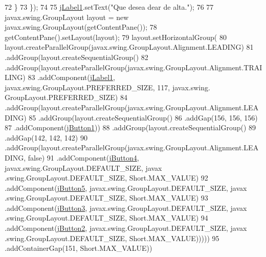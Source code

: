 \begin{DoxyCode}
72             \}
73         \});
74 
75         \mbox{\hyperlink{class_interfaz_package_1_1_interfaz_alta_a353b3664adfc462e1ec4be9e78f5da33}{jLabel1}}.setText(\textcolor{stringliteral}{"Que desea dear de alta."});
76 
77         javax.swing.GroupLayout layout = \textcolor{keyword}{new} javax.swing.GroupLayout(getContentPane());
78         getContentPane().setLayout(layout);
79         layout.setHorizontalGroup(
80             layout.createParallelGroup(javax.swing.GroupLayout.Alignment.LEADING)
81             .addGroup(layout.createSequentialGroup()
82                 .addGroup(layout.createParallelGroup(javax.swing.GroupLayout.Alignment.TRAILING)
83                     .addComponent(\mbox{\hyperlink{class_interfaz_package_1_1_interfaz_alta_a353b3664adfc462e1ec4be9e78f5da33}{jLabel1}}, javax.swing.GroupLayout.PREFERRED\_SIZE, 117, javax.swing.
      GroupLayout.PREFERRED\_SIZE)
84                     .addGroup(layout.createParallelGroup(javax.swing.GroupLayout.Alignment.LEADING)
85                         .addGroup(layout.createSequentialGroup()
86                             .addGap(156, 156, 156)
87                             .addComponent(\mbox{\hyperlink{class_interfaz_package_1_1_interfaz_alta_a04cc5364c89f6cbda8e46022ea7ddbf4}{jButton1}}))
88                         .addGroup(layout.createSequentialGroup()
89                             .addGap(142, 142, 142)
90                             .addGroup(layout.createParallelGroup(javax.swing.GroupLayout.Alignment.LEADING,
       \textcolor{keyword}{false})
91                                 .addComponent(\mbox{\hyperlink{class_interfaz_package_1_1_interfaz_alta_a1766bf9cf73dcb04fa55a88750a864f5}{jButton4}}, javax.swing.GroupLayout.DEFAULT\_SIZE, javax
      .swing.GroupLayout.DEFAULT\_SIZE, Short.MAX\_VALUE)
92                                 .addComponent(\mbox{\hyperlink{class_interfaz_package_1_1_interfaz_alta_a368946c13229a442a7633f37c8fa0425}{jButton5}}, javax.swing.GroupLayout.DEFAULT\_SIZE, javax
      .swing.GroupLayout.DEFAULT\_SIZE, Short.MAX\_VALUE)
93                                 .addComponent(\mbox{\hyperlink{class_interfaz_package_1_1_interfaz_alta_a2bce273c449eda774b687351d594071c}{jButton3}}, javax.swing.GroupLayout.DEFAULT\_SIZE, javax
      .swing.GroupLayout.DEFAULT\_SIZE, Short.MAX\_VALUE)
94                                 .addComponent(\mbox{\hyperlink{class_interfaz_package_1_1_interfaz_alta_a1657bb8744ea591f1eb9e70c5c570169}{jButton2}}, javax.swing.GroupLayout.DEFAULT\_SIZE, javax
      .swing.GroupLayout.DEFAULT\_SIZE, Short.MAX\_VALUE)))))
95                 .addContainerGap(151, Short.MAX\_VALUE))

\end{DoxyCode}
